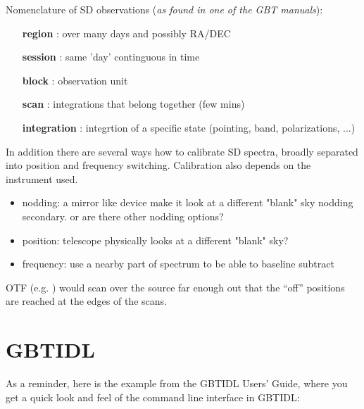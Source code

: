 \documentclass[12pt,a4paper]{article}
\begin{document}
Nomenclature of SD observations ({\it as found in one of the GBT manuals}):

\begin{itemize}
  \item[{\bf region}]  : over many days and possibly RA/DEC
  \item[{\bf session}] : same 'day' continguous in time
  \item[{\bf block}]   : observation unit
  \item[{\bf scan}]    : integrations that belong together (few mins)
  \item[{\bf integration}] : integrtion of a specific state (pointing, band, polarizations, ...)
\end{itemize}   


In addition there are several ways how to calibrate SD spectra, broadly separated
into position and frequency switching. Calibration also depends on the instrument used.

\begin{itemize}
\item
nodding:    a mirror like device make it look at a different "blank" sky
nodding secondary. or are there other nodding options?
\item
position:   telescope physically looks at a different "blank" sky?
\item
frequency:  use a nearby part of spectrum to be able to baseline subtract
\end{itemize}

OTF (e.g. \cite{2007AA...474..679M})
would scan over the source far enough out that the ``off'' positions are reached at
the edges of the scans.

\section{GBTIDL}

As a reminder, here is the example from the GBTIDL Users' Guide, where you get
a quick look and feel of the command line interface in GBTIDL:
\end{document}
